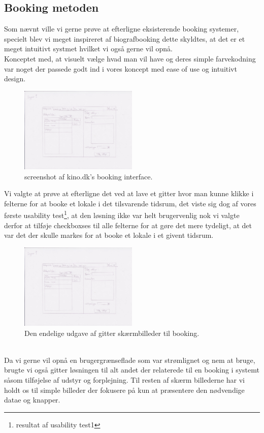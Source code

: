 \subsection{Booking metoden}
Som nævnt ville vi gerne prøve at efterligne eksisterende booking systemer, specielt blev vi meget inspireret af biografbooking dette skyldtes, at det er et meget intuitivt systmet hvilket vi også gerne vil opnå.\\ Konceptet med, at visuelt vælge hvad man vil have og deres simple farvekodning var noget der passede godt ind i vores koncept med ease of use og intuitivt design.
\begin{figure}[h!]
  \caption{screenshot af kino.dk's booking interface.}
  \centering
    \includegraphics[width=0.5\textwidth]{Appendix/GUI-Prototype/PaperMockup/UdstyrsListe}
\end{figure}


Vi valgte at prøve at efterligne det ved at lave et gitter hvor man kunne klikke i felterne for at booke et lokale i det tilsvarende tidsrum, det viste sig dog af vores første usability test\footnote{resultat af usability test1}, at den løsning ikke var helt brugervenlig nok vi valgte derfor at tilføje checkboxses til alle felterne for at gøre det mere tydeligt, at det var det der skulle markes for at booke et lokale i et givent tidsrum.
\begin{figure}[h!]
\label{GitterBook}
  \caption{Den endelige udgave af gitter skærmbilleder til booking.}
  \centering
    \includegraphics[width=0.5\textwidth]{Appendix/GUI-Prototype/PaperMockup/UdstyrsListe}
\end{figure}
\\Da vi gerne vil opnå en brugergrænseflade som var strømlignet og nem at bruge, brugte vi også gitter løsningen til alt andet der relaterede til en booking i systemt såsom tilføjelse af  udstyr og forplejning. Til resten af skærm billederne har vi holdt os til simple billeder der fokusere på kun at præsentere den nødvendige datae og knapper.

